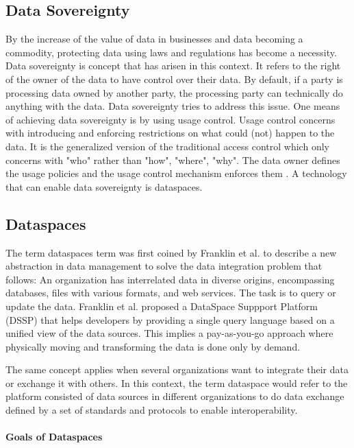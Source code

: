 \documentclass{article}
\begin{document}
\subsection{Data Sovereignty}
By the increase of the value of data in businesses and data becoming a commodity, protecting data using laws and regulations has become a necessity. Data sovereignty is concept that has arisen in this context. It refers to the right of the owner of the data to have control over their data. By default, if a party is processing data owned by another party, the processing party can technically do anything with the data. Data sovereignty tries to address this issue. One means of achieving data sovereignty is by using usage control. Usage control concerns with introducing and enforcing restrictions on what could (not) happen to the data. It is the generalized version of the traditional access control which only concerns with "who" rather than "how", "where", "why". The data owner defines the usage policies and the usage control mechanism enforces them \cite{eitel_usage_2021}. A technology that can enable data sovereignty is dataspaces.

\subsection{Dataspaces}
The term dataspaces term was first coined by Franklin et al. \cite{franklin_databases_2005} to describe a new abstraction in data management to solve the data integration problem that follows: An organization has interrelated data in diverse origins, encompassing databases, files with various formats, and web services. The task is to query or update the data.
Franklin et al. proposed a DataSpace Suppport Platform (DSSP) that helps developers by providing a single query language based on a unified view of the data sources. This implies a pay-as-you-go approach where physically moving and transforming the data is done only by demand.

The same concept applies when several organizations want to integrate their data or exchange it with others. In this context, the term dataspace would refer to the platform consisted of data sources in different organizations to do data exchange defined by a set of standards and protocols to enable interoperability. \cite{reiberg_what_2022}

\paragraph{Goals of Dataspaces}
\end{document}
